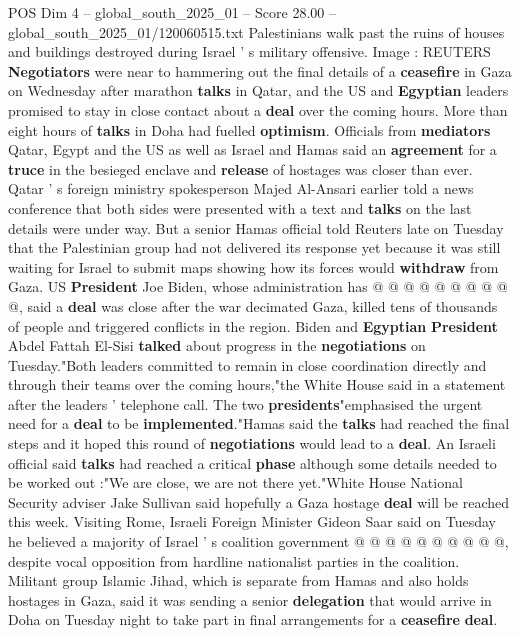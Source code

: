 \begin{textsample}{POS Dim 4 – global\_south\_2025\_01 – Score 28.00 – global\_south\_2025\_01/120060515.txt}  \label{ex:f4_pos_006}
Palestinians walk past the ruins of houses and buildings destroyed during Israel ' s military offensive.
Image : REUTERS \textbf{Negotiators} were near to hammering out the final details of a \textbf{ceasefire} in Gaza on Wednesday after marathon \textbf{talks} in Qatar, and the US and \textbf{Egyptian} leaders promised to stay in close contact about a \textbf{deal} over the coming hours.
More than eight hours of \textbf{talks} in Doha had fuelled \textbf{optimism}.
Officials from \textbf{mediators} Qatar, Egypt and the US as well as Israel and Hamas said an \textbf{agreement} for a \textbf{truce} in the besieged enclave and \textbf{release} of hostages was closer than ever.
Qatar ' s foreign ministry spokesperson Majed Al-Ansari earlier told a news conference that both sides were presented with a text and \textbf{talks} on the last details were under way.
But a senior Hamas official told Reuters late on Tuesday that the Palestinian group had not delivered its response yet because it was still waiting for Israel to submit maps showing how its forces would \textbf{withdraw} from Gaza.
US \textbf{President} Joe Biden, whose administration has @ @ @ @ @ @ @ @ @ @, said a \textbf{deal} was close after the war decimated Gaza, killed tens of thousands of people and triggered conflicts in the region.
Biden and \textbf{Egyptian} \textbf{President} Abdel Fattah El-Sisi \textbf{talked} about progress in the \textbf{negotiations} on Tuesday."Both leaders committed to remain in close coordination directly and through their teams over the coming hours,"the White House said in a statement after the leaders ' telephone call.
The two \textbf{presidents}"emphasised the urgent need for a \textbf{deal} to be \textbf{implemented}."Hamas said the \textbf{talks} had reached the final steps and it hoped this round of \textbf{negotiations} would lead to a \textbf{deal}.
An Israeli official said \textbf{talks} had reached a critical \textbf{phase} although some details needed to be worked out :"We are close, we are not there yet."White House National Security adviser Jake Sullivan said hopefully a Gaza hostage \textbf{deal} will be reached this week.
Visiting Rome, Israeli Foreign Minister Gideon Saar said on Tuesday he believed a majority of Israel ' s coalition government @ @ @ @ @ @ @ @ @ @, despite vocal opposition from hardline nationalist parties in the coalition.
Militant group Islamic Jihad, which is separate from Hamas and also holds hostages in Gaza, said it was sending a senior \textbf{delegation} that would arrive in Doha on Tuesday night to take part in final arrangements for a \textbf{ceasefire} \textbf{deal}.

\end{textsample}
